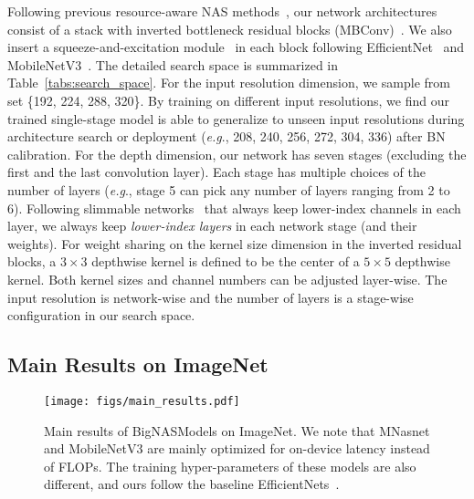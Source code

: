 \documentclass[runningheads]{llncs}
\def\onedot{.}
\def\eg{\emph{e.g}\onedot} \def\Eg{\emph{E.g}\onedot}
\begin{document}
Following previous resource-aware NAS methods~\cite{tan2018mnasnet, tan2019efficientnet, cai2018proxylessnas, wu2019fbnet, howard2019searching}, our network architectures consist of a stack with inverted bottleneck residual blocks (MBConv)~\cite{sandler2018inverted}. We also insert a squeeze-and-excitation module~\cite{hu2018squeeze} in each block following EfficientNet~\cite{tan2019efficientnet} and MobileNetV3~\cite{howard2019searching}. The detailed search space is summarized in Table~\ref{tabs:search_space}. For the input resolution dimension, we sample from set \{192, 224, 288, 320\}. By training on different input resolutions, we find our trained single-stage model is able to generalize to unseen input resolutions during architecture search or deployment (\eg, 208, 240, 256, 272, 304, 336) after BN calibration. For the depth dimension, our network has seven stages (excluding the first and the last convolution layer). Each stage has multiple choices of the number of layers (\eg, stage 5 can pick any number of layers ranging from 2 to 6). Following slimmable networks~\cite{yu2018slimmable} that always keep lower-index channels in each layer, we always keep \textit{lower-index layers} in each network stage (and their weights). For weight sharing on the kernel size dimension in the inverted residual blocks, a \(3 \times 3\) depthwise kernel is defined to be the center of a \(5 \times 5\) depthwise kernel. Both kernel sizes and channel numbers can be adjusted layer-wise. The input resolution is network-wise and the number of layers is a stage-wise configuration in our search space.

\subsection{Main Results on ImageNet}
\begin{figure}[ht]
\centering
\texttt{[image: figs/main\_results.pdf]}
\caption{Main results of BigNASModels on ImageNet. We note that MNasnet and MobileNetV3 are mainly optimized for on-device latency instead of FLOPs. The training hyper-parameters of these models are also different, and ours follow the baseline EfficientNets~\cite{tan2019efficientnet}.}
\label{figs:bignasnet}
\end{figure}
\end{document}
